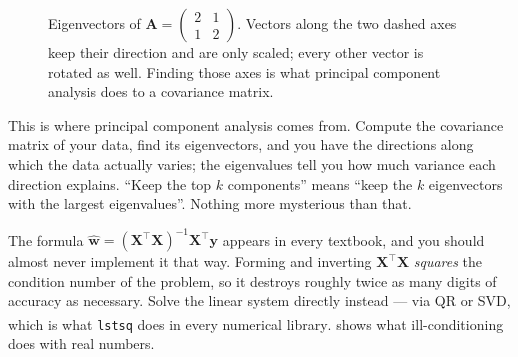 \begin{figure}[htbp]
\centering
{}
\caption{Eigenvectors of $\mathbf{A}=\left(\begin{smallmatrix}2&1\\1&2
\end{smallmatrix}\right)$. Vectors along the two dashed axes keep their
direction and are only scaled; every other vector is rotated as well. Finding
those axes is what principal component analysis does to a covariance matrix.}
\label{fig:math-eigenvectors}
\end{figure}

\begin{engineernote}
This is where principal component analysis comes from. Compute the covariance
matrix of your data, find its eigenvectors, and you have the directions along
which the data actually varies; the eigenvalues tell you how much variance each
direction explains. ``Keep the top $k$ components'' means ``keep the $k$
eigenvectors with the largest eigenvalues''. Nothing more mysterious than
that.
\end{engineernote}

\begin{cautionbox}
The formula $\hat{\mathbf{w}} = (\mathbf{X}^{\!\top}\mathbf{X})^{-1}
\mathbf{X}^{\!\top}\mathbf{y}$ appears in every textbook, and you should almost
never implement it that way. Forming and inverting
$\mathbf{X}^{\!\top}\mathbf{X}$ \emph{squares} the condition number of the
problem, so it destroys roughly twice as many digits of accuracy as necessary.
Solve the linear system directly instead --- via QR or SVD, which is what
\texttt{lstsq} does in every numerical
library\textsuperscript{\cite[][ch.~20]{highamAccuracyStabilityNumerical2002}}.
 shows what ill-conditioning does with real numbers.
\end{cautionbox}


